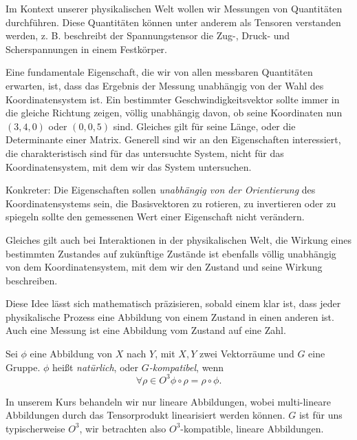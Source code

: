 Im Kontext unserer physikalischen Welt wollen wir Messungen von Quantitäten durchführen. Diese Quantitäten können unter anderem als Tensoren verstanden werden, z. B. beschreibt der Spannungstensor die Zug-, Druck- und Scherspannungen in einem Festkörper.

Eine fundamentale Eigenschaft, die wir von allen messbaren Quantitäten erwarten, ist, dass das Ergebnis der Messung unabhängig von der Wahl des Koordinatensystem ist. Ein bestimmter Geschwindigkeitsvektor sollte immer in die gleiche Richtung zeigen, völlig unabhängig davon, ob seine Koordinaten nun $(3,4,0)$ oder $(0,0,5)$ sind. Gleiches gilt für seine Länge, oder die Determinante einer Matrix. Generell sind wir an den Eigenschaften interessiert, die charakteristisch sind für das untersuchte System, nicht für das Koordinatensystem, mit dem wir das System untersuchen.

Konkreter: Die Eigenschaften sollen \emph{unabhängig von der Orientierung} des Koordinatensystems sein, die Basisvektoren zu rotieren, zu invertieren oder zu spiegeln sollte den gemessenen Wert einer Eigenschaft nicht verändern.

Gleiches gilt auch bei Interaktionen in der physikalischen Welt, die Wirkung eines bestimmten Zustandes auf zukünftige Zustände ist ebenfalls völlig unabhängig von dem Koordinatensystem, mit dem wir den Zustand und seine Wirkung beschreiben.

Diese Idee lässt sich mathematisch präzisieren, sobald einem klar ist, dass jeder physikalische Prozess eine Abbildung von einem Zustand in einen anderen ist. Auch eine Messung ist eine Abbildung vom Zustand auf eine Zahl.

\begin{definition}
	Sei $\phi$ eine Abbildung von $X$ nach $Y$, mit $X,Y$ zwei Vektorräume und $G$ eine Gruppe. $\phi$ heißt \emph{natürlich}, oder \emph{$G$-kompatibel}, wenn 
	\begin{equation*}
		\forall \rho\in O^3 \phi \circ \rho = \rho \circ \phi.
	\end{equation*}
\end{definition}
In unserem Kurs behandeln wir nur lineare Abbildungen, wobei multi-lineare Abbildungen durch das Tensorprodukt linearisiert werden können. $G$ ist für uns typischerweise $O^3$, wir betrachten also $O^3$-kompatible, lineare Abbildungen.

